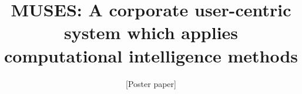 \documentclass{sig-alternate}
\begin{document}
%

\title{MUSES: A corporate user-centric system which applies computational intelligence methods}
\subtitle{[Poster paper]}
%
%
%
%
%
\end{document}
